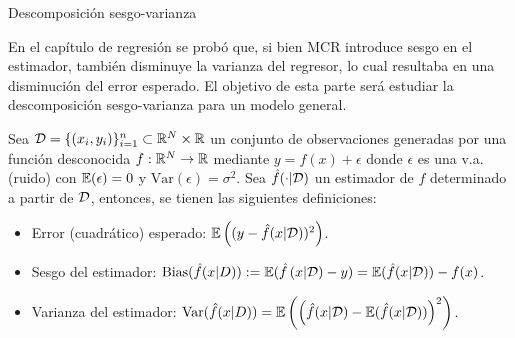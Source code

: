 \documentclass[9pt]{beamer}
\begin{document}
\begin{frame}{Descomposición sesgo-varianza}

En el capítulo de regresión se probó que, si bien MCR introduce sesgo en el estimador, también disminuye la varianza del regresor, lo cual resultaba en una disminución del error esperado. El objetivo de esta parte será estudiar la descomposición sesgo-varianza para un modelo general.\pause

\begin{definition}
	Sea ${\mathcal D}=\{(x_i,y_i)\}_{i=1}^n\subset\mathbb{R}^N\times\mathbb{R}$ un conjunto de observaciones generadas por una función desconocida $f:\mathbb{R}^N\to\mathbb{R}$ mediante $y=f(x)+\epsilon$ donde $\epsilon$ es una v.a. (ruido) con $\operatorname{\mathbb{E}}(\epsilon)=0$ y $\text{Var}(\epsilon)=\sigma^2$. Sea $\hat{f}(\cdot|{\mathcal D})$ un estimador de $f$ determinado a partir de ${\mathcal D}$, entonces, se tienen las siguientes definiciones:
	
	\begin{itemize}
		\item Error (cuadrático) esperado: $\operatorname{\mathbb{E}}\left((y-\hat{f}(x|{\mathcal D}))^2\right)$.\pause
		\item Sesgo del estimador: $\text{Bias}(\hat{f}(x|D)):=\operatorname{\mathbb{E}}(\hat{f}\left(x|{\mathcal D}) - y\right) = \operatorname{\mathbb{E}}(\hat{f}(x|{\mathcal D})) - f(x)$.\pause
		\item Varianza del estimador: $\text{Var}(\hat{f}(x|D)) = \operatorname{\mathbb{E}}\left(\left(\hat{f}(x|{\mathcal D})-\operatorname{\mathbb{E}}(\hat{f}(x|{\mathcal D}))\right)^2\right)$.
		
	\end{itemize}
\end{definition}
	
\end{frame}
\end{document}
